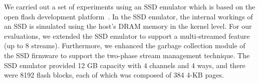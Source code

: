 We carried out a set of experiments using an SSD emulator which is based on the
open flash development platform~\cite{AMF}.  
In the SSD emulator, the internal workings of an SSD is simulated using the host's DRAM memory in the kernel level. 
For our evaluations, we extended the SSD emulator to support a multi-streamed feature %
(up to 8 streams). %
Furthermore, we enhanced the garbage collection module of the SSD firmware to support the two-phase stream management technique. 
The SSD emulator provided 12 GB capacity with 4 channels and 4 ways, and there were 8192 flash blocks, each of which was composed of 384 4-KB pages.  


